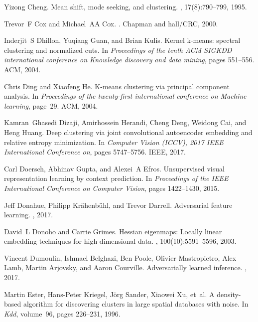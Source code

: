 \documentclass{article}
\begin{document}
\begin{thebibliography}{10}
Yizong Cheng.
\newblock Mean shift, mode seeking, and clustering.
,
  17(8):790--799, 1995.

Trevor~F Cox and Michael~AA Cox.
.
\newblock Chapman and hall/CRC, 2000.

Inderjit~S Dhillon, Yuqiang Guan, and Brian Kulis.
\newblock Kernel k-means: spectral clustering and normalized cuts.
\newblock In {\em Proceedings of the tenth ACM SIGKDD international conference
  on Knowledge discovery and data mining}, pages 551--556. ACM, 2004.

Chris Ding and Xiaofeng He.
\newblock K-means clustering via principal component analysis.
\newblock In {\em Proceedings of the twenty-first international conference on
  Machine learning}, page~29. ACM, 2004.

Kamran~Ghasedi Dizaji, Amirhossein Herandi, Cheng Deng, Weidong Cai, and Heng
  Huang.
\newblock Deep clustering via joint convolutional autoencoder embedding and
  relative entropy minimization.
\newblock In {\em Computer Vision (ICCV), 2017 IEEE International Conference
  on}, pages 5747--5756. IEEE, 2017.

Carl Doersch, Abhinav Gupta, and Alexei~A Efros.
\newblock Unsupervised visual representation learning by context prediction.
\newblock In {\em Proceedings of the IEEE International Conference on Computer
  Vision}, pages 1422--1430, 2015.

Jeff Donahue, Philipp Kr{\"a}henb{\"u}hl, and Trevor Darrell.
\newblock Adversarial feature learning.
,
  2017.

David~L Donoho and Carrie Grimes.
\newblock Hessian eigenmaps: Locally linear embedding techniques for
  high-dimensional data.
,
  100(10):5591--5596, 2003.

Vincent Dumoulin, Ishmael Belghazi, Ben Poole, Olivier Mastropietro, Alex Lamb,
  Martin Arjovsky, and Aaron Courville.
\newblock Adversarially learned inference.
,
  2017.

Martin Ester, Hans-Peter Kriegel, J{\"o}rg Sander, Xiaowei Xu, et~al.
\newblock A density-based algorithm for discovering clusters in large spatial
  databases with noise.
\newblock In {\em Kdd}, volume~96, pages 226--231, 1996.


\end{thebibliography}
\end{document}
